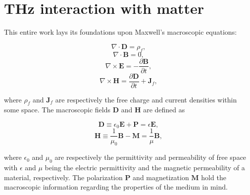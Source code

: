 
\section{THz interaction with matter}
This entire work lays its foundations upon Maxwell's macroscopic equations:

\begin{multicols}{2}
\begin{equation}
\nabla \cdot \mathbf{D} = \rho_f,
\label{eq:max1}
\end{equation}
\begin{equation}
\nabla \cdot \mathbf{B}=0,
\label{eq:max2}
\end{equation}
\begin{equation}
\nabla \times \mathbf{E}=-\frac{\partial \mathbf{B}}{\partial t},
\label{eq:max3}
\end{equation}
\begin{equation}
\nabla \times \mathbf{H}=\frac{\partial \mathbf{D}}{\partial t} + \mathbf{J}_f,
\label{eq:max4}
\end{equation}
\end{multicols} \noindent
where $\rho_f$ and $\mathbf{J}_f$ are respectively the free charge and current densities within some space. The macroscopic fields $\mathbf{D}$ and $\mathbf{H}$ are defined as
\begin{multicols}{2}
\begin{equation}
\mathbf{D} \equiv \epsilon_0 \mathbf{E} + \mathbf{P}=\epsilon \mathbf{E},
\label{eq:D definition}
\end{equation}
\begin{equation}
\mathbf{H} \equiv \frac{1}{\mu_0}\mathbf{B} - \mathbf{M}=\frac{1}{\mu}\mathbf{B},
\label{eq:H definition}
\end{equation}
\end{multicols} \noindent
where $\epsilon_0$ and $\mu_0$ are respectively the permittivity and permeability of free space with $\epsilon$ and $\mu$ being the electric permittivity and the magnetic permeability of a material, respectively. The polarization $\mathbf{P}$ and magnetization $\mathbf{M}$ hold the macroscopic information regarding the properties of the medium in mind. 



